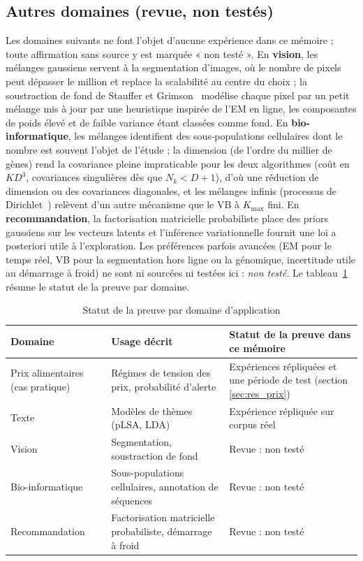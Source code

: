 \subsection{Autres domaines (revue, non testés)}\label{sec:vision_et_bio_informatique_revue}\label{sec:systemes_de_recommandation_revue_de}
Les domaines suivants ne font l'objet d'aucune expérience dans ce mémoire ; toute affirmation sans source y est marquée « non testé ». En \textbf{vision}, les mélanges gaussiens servent à la segmentation d'images, où le nombre de pixels peut dépasser le million et replace la scalabilité au centre du choix ; la soustraction de fond de Stauffer et Grimson~\cite{stauffer1999} modélise chaque pixel par un petit mélange mis à jour par une heuristique inspirée de l'EM en ligne, les composantes de poids élevé et de faible variance étant classées comme fond. En \textbf{bio-informatique}, les mélanges identifient des sous-populations cellulaires dont le nombre est souvent l'objet de l'étude ; la dimension (de l'ordre du millier de gènes) rend la covariance pleine impraticable pour les deux algorithmes (coût en $KD^3$, covariances singulières dès que $N_k < D+1$), d'où une réduction de dimension ou des covariances diagonales, et les mélanges infinis (processus de Dirichlet~\cite{rasmussen2000}) relèvent d'un autre mécanisme que le VB à $K_{\max}$ fini. En \textbf{recommandation}, la factorisation matricielle probabiliste place des priors gaussiens sur les vecteurs latents et l'inférence variationnelle fournit une loi a posteriori utile à l'exploration. Les préférences parfois avancées (EM pour le temps réel, VB pour la segmentation hors ligne ou la génomique, incertitude utile au démarrage à froid) ne sont ni sourcées ni testées ici : \emph{non testé}. Le tableau~\ref{tab:3_1} résume le statut de la preuve par domaine.

\begin{table}[H]
\centering
\small
\setlength{\tabcolsep}{0.14cm}
\begin{tabular}{|p{3.6cm}|p{5.4cm}|p{5.2cm}|}
\hline
\textbf{Domaine} & \textbf{Usage décrit} & \textbf{Statut de la preuve dans ce mémoire} \\
\hline
Prix alimentaires (cas pratique) & Régimes de tension des prix, probabilité d'alerte & Expériences répliquées et une période de test (section \ref{sec:res_prix}) \\
\hline
Texte & Modèles de thèmes (pLSA, LDA) & Expérience répliquée sur corpus réel \\
\hline
Vision & Segmentation, soustraction de fond & Revue : non testé \\
\hline
Bio-informatique & Sous-populations cellulaires, annotation de séquences & Revue : non testé \\
\hline
Recommandation & Factorisation matricielle probabiliste, démarrage à froid & Revue : non testé \\
\hline
\end{tabular}
\caption{Statut de la preuve par domaine d'application}
\label{tab:3_1}
\end{table}

